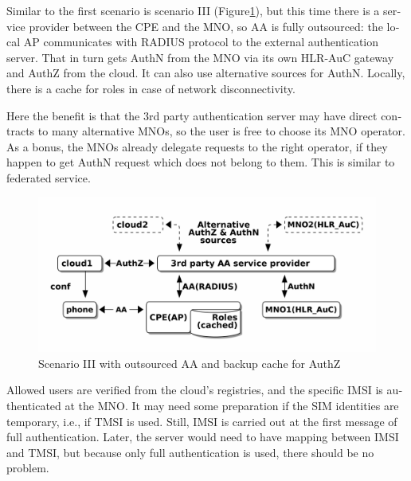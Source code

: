 \documentclass[12pt,a4paper,english]{tutthesis}
\begin{document}
\begin{otherlanguage}{english}
\label{scenario-iii}

Similar to the first scenario is scenario III (Figure\ref{fig:scenario-III}), 
but this time there is a service provider between the CPE and the MNO, so AA is fully outsourced:
the local AP communicates with RADIUS protocol to the external
authentication server. That in turn gets AuthN from the MNO via its own
HLR-AuC gateway and AuthZ from the cloud. It can also use alternative
sources for AuthN.
Locally, there is a cache for roles in case of network disconnectivity.

Here the benefit is that the 3rd party authentication server may have direct
contracts to many alternative MNOs, so the user is free to choose its
MNO operator. As a bonus,  the MNOs already delegate requests to the right
operator, if they happen to get AuthN request which does not belong to
them. This is similar to federated service.

\begin{figure}[htb]
\centering
\includegraphics[width=.9\linewidth]{scenIII.png}
\caption{\label{fig:scenario-III}Scenario III with outsourced AA and backup cache for AuthZ}
\end{figure}

Allowed users are verified from the cloud's registries, and the specific IMSI is
authenticated at the MNO.  It may need some preparation if the SIM
identities are temporary, i.e., if TMSI is used.  Still, IMSI is carried
out at the first message 
of full authentication. Later, the server would need to have mapping
between IMSI and TMSI, but because only full authentication is used,
there should be no problem.




\end{otherlanguage}
\end{document}
